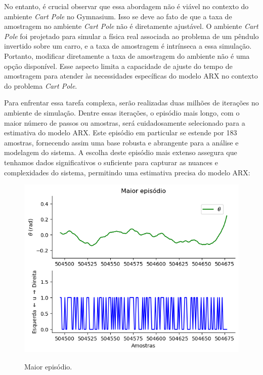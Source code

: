 \documentclass[12pt,           %
a4paper,                       %
openany,                       %
oneside,                       %
chapter=TITLE,                 %
english,                       %
spanish,                       %
brazil,                        %
sumario=tradicional]{abntex2}  %
\begin{document}
\begin{OnehalfSpace}
No entanto, é crucial observar que essa abordagem não é viável no contexto do ambiente \textit{Cart Pole} no Gymnasium. Isso se deve ao fato de que a taxa de amostragem no ambiente \textit{Cart Pole} não é diretamente ajustável. O ambiente \textit{Cart Pole} foi projetado para simular a física real associada ao problema de um pêndulo invertido sobre um carro, e a taxa de amostragem é intrínseca a essa simulação. Portanto, modificar diretamente a taxa de amostragem do ambiente não é uma opção disponível. Esse aspecto limita a capacidade de ajuste do tempo de amostragem para atender às necessidades específicas do modelo ARX no contexto do problema \textit{Cart Pole}.

Para enfrentar essa tarefa complexa, serão realizadas duas milhões de iterações no ambiente de simulação. Dentre essas iterações, o episódio mais longo, com o maior número de passos ou amostras, será cuidadosamente selecionado para a estimativa do modelo ARX. Este episódio em particular se estende por 183 amostras, fornecendo assim uma base robusta e abrangente para a análise e modelagem do sistema. A escolha deste episódio mais extenso assegura que tenhamos dados significativos o suficiente para capturar as nuances e complexidades do sistema, permitindo uma estimativa precisa do modelo ARX:

\begin{figure}[H]
     \centering
     \vspace*{-.2cm}
     \caption{Maior episódio.}
     \includegraphics[scale=0.55]{mep.png}
     \label{fig:PRBSa}
\end{figure}
\vspace*{-0.7cm}
{\raggedright {}}


\end{OnehalfSpace}
\end{document}
